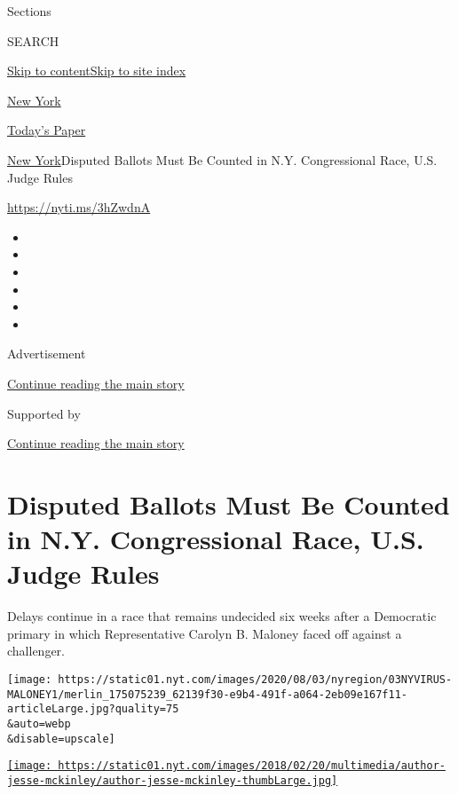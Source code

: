 Sections

SEARCH

\protect\hyperlink{site-content}{Skip to
content}\protect\hyperlink{site-index}{Skip to site index}

\href{https://www.nytimes.com/section/nyregion}{New York}

\href{https://myaccount.nytimes.com/auth/login?response_type=cookie\&client_id=vi}{}

\href{https://www.nytimes.com/section/todayspaper}{Today's Paper}

\href{/section/nyregion}{New York}\textbar{}Disputed Ballots Must Be
Counted in N.Y. Congressional Race, U.S. Judge Rules

\url{https://nyti.ms/3hZwdnA}

\begin{itemize}
\item
\item
\item
\item
\item
\item
\end{itemize}

Advertisement

\protect\hyperlink{after-top}{Continue reading the main story}

Supported by

\protect\hyperlink{after-sponsor}{Continue reading the main story}

\hypertarget{disputed-ballots-must-be-counted-in-ny-congressional-race-us-judge-rules}{%
\section{Disputed Ballots Must Be Counted in N.Y. Congressional Race,
U.S. Judge
Rules}\label{disputed-ballots-must-be-counted-in-ny-congressional-race-us-judge-rules}}

Delays continue in a race that remains undecided six weeks after a
Democratic primary in which Representative Carolyn B. Maloney faced off
against a challenger.

\texttt{[image: https://static01.nyt.com/images/2020/08/03/nyregion/03NYVIRUS-MALONEY1/merlin\_175075239\_62139f30-e9b4-491f-a064-2eb09e167f11-articleLarge.jpg?quality=75\\\&auto=webp\\\&disable=upscale]}

\href{https://www.nytimes.com/by/jesse-mckinley}{\texttt{[image: https://static01.nyt.com/images/2018/02/20/multimedia/author-jesse-mckinley/author-jesse-mckinley-thumbLarge.jpg]}}

